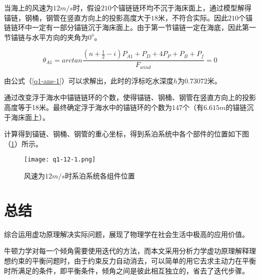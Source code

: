 \documentclass[withoutpreface,bwprint]{cumcmthesis} %
\begin{document}
\par 当海上的风速为$12m/s$时，假设$210$个锚链链环均不沉于海床面上，通过模型解得锚链，钢桶，钢管在竖直方向上的投影高度大于$18$米，不符合实际。因此$210$个锚链链环中一定有一部分锚链沉于海床面上。由于第一节锚链一定在海底，因此第一节锚链与水平方向的夹角为$0^o$。

\begin{equation}
	\label{q1-ans-1}
	\theta_{A1} = arctan\frac{(n + \frac{1}{2} - i)P_{A1} +P_D+4P_P+P_B+P_f}{F_{wind}} = 0 
\end{equation}
\par 由公式（\ref{q1-ans-1}）可以求解出，此时的浮标吃水深度$h$为$0.73072$米。
\par 通过改变浮于海水中锚链链环的个数，使得锚链、钢桶、钢管在竖直方向上的投影高度等于18米。最终确定浮于海水中的锚链环的个数为$147$个（有$6.615m$的锚链沉于海床面上）。
\par 计算得到锚链、钢桶、钢管的重心坐标，得到系泊系统中各个部件的位置如下图（\ref{fig:q1-12-1}）所示。
\begin{figure}[h]
\small
\centering
\texttt{[image: q1-12-1.png]}
\caption{风速为$12m/s$时系泊系统各组件位置} \label{fig:q1-12-1}
\end{figure}





\section{总结}
\par 综合运用虚功原理解决实际问题，展现了物理学在社会生活中极高的应用价值。

\par 牛顿力学对每一个倾角需要使用迭代的方法，而本文采用分析力学虚功原理解释理想约束的平衡问题时，由于约束反力自动消去，可以简单的用它去求主动力在平衡时所满足的条件，即平衡条件，倾角之间是彼此相互独立的，省去了迭代步骤。
\end{document}
